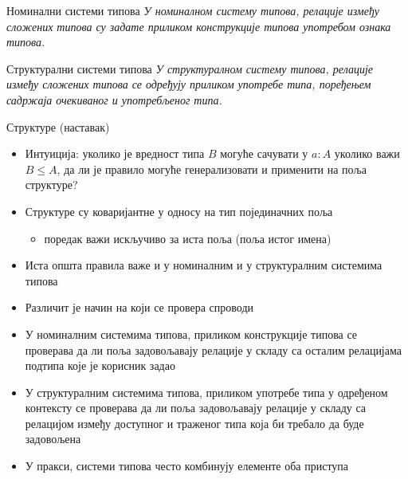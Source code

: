 \documentclass[xcolor=table]{beamer}
\begin{document}
    \begin{frame}{Номинални системи типова}
        \textit{У номиналном систему типова, релације између сложених типова су задате приликом конструкције типова употребом ознака типова.}
    \end{frame}

    \begin{frame}{Структурални системи типова}
        \textit{У структуралном систему типова, релације између сложених типова се одређују приликом употребе типа, поређењем садржаја очекиваног и употребљеног типа.}
    \end{frame}

    \begin{frame}[allowframebreaks]{Структуре (наставак)}
        \begin{itemize}
            \item Интуиција: уколико је вредност типа \begin{math}B\end{math} могуће сачувати у \begin{math}a: A\end{math} уколико важи \begin{math}B \leq A\end{math}, да ли је правило могуће генерализовати и применити на поља структуре?
            \item Структуре су коваријантне у односу на тип појединачних поља
            \begin{itemize}
                \item поредак важи искључиво за иста поља (поља истог имена)
            \end{itemize}
            \item Иста општа правила важе и у номиналним и у структуралним системима типова
            \item Различит је начин на који се провера спроводи
        \end{itemize}

        \framebreak

        \begin{itemize}
            \item У номиналним системима типова, приликом конструкције типова се проверава да ли поља задовољавају релације у складу са осталим релацијама подтипа које је корисник задао
            \item У структуралним системима типова, приликом употребе типа у одређеном контексту се проверава да ли поља задовољавају релације у складу са релацијом између доступног и траженог типа која би требало да буде задовољена
            \item У пракси, системи типова често комбинују елементе оба приступа
        \end{itemize}
    \end{frame}
\end{document}
